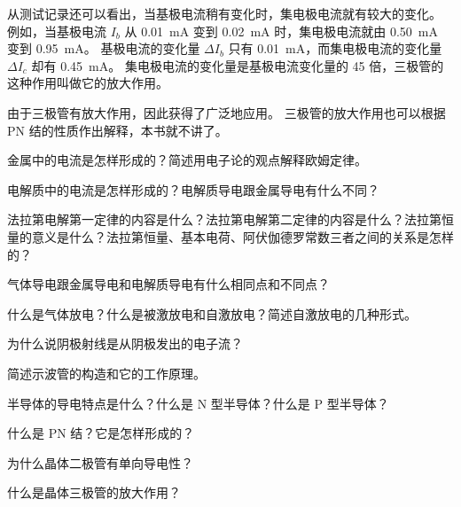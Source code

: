 从测试记录还可以看出，当基极电流稍有变化时，集电极电流就有较大的变化。
例如，当基极电流 $I_b$ 从 \qty{0.01}{mA} 变到 \qty{0.02}{mA} 时，集电极电流就由 \qty{0.50}{mA} 变到 \qty{0.95}{mA}。
基极电流的变化量 $\Delta I_b$ 只有 \qty{0.01}{mA}，而集电极电流的变化量 $\Delta I_c$ 却有 \qty{0.45}{mA}。
集电极电流的变化量是基极电流变化量的 45 倍，三极管的这种作用叫做它的放大作用。

由于三极管有放大作用，因此获得了广泛地应用。
三极管的放大作用也可以根据 PN 结的性质作出解释，本书就不讲了。

\begin{Review}
\begin{question}
  \item 金属中的电流是怎样形成的？简述用电子论的观点解释欧姆定律。
  \item 电解质中的电流是怎样形成的？电解质导电跟金属导电有什么不同？
  \item 法拉第电解第一定律的内容是什么？法拉第电解第二定律的内容是什么？法拉第恒量的意义是什么？法拉第恒量、基本电荷、阿伏伽德罗常数三者之间的关系是怎样的？
  \item 气体导电跟金属导电和电解质导电有什么相同点和不同点？
  \item 什么是气体放电？什么是被激放电和自激放电？简述自激放电的几种形式。
  \item 为什么说阴极射线是从阴极发出的电子流？
  \item 简述示波管的构造和它的工作原理。
  \item 半导体的导电特点是什么？什么是 N 型半导体？什么是 P 型半导体？
  \item 什么是 PN 结？它是怎样形成的？
  \item 为什么晶体二极管有单向导电性？
  \item 什么是晶体三极管的放大作用？
\end{question}
\end{Review}
